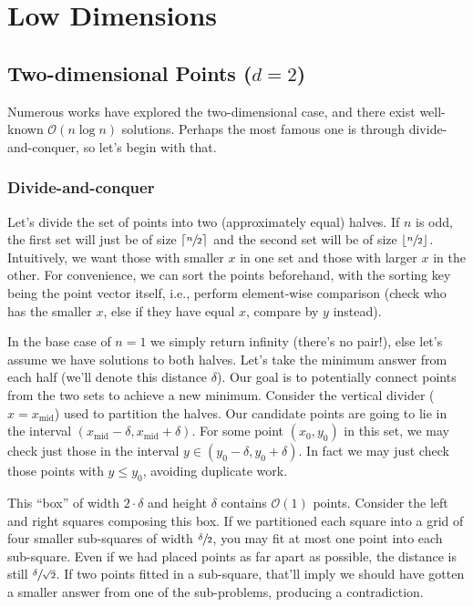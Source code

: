 
\chapter{Low Dimensions}

\section{Two-dimensional Points (\texorpdfstring{$d=2$}{d = 2})}

Numerous works have explored the two-dimensional case, and there exist well-known
$\mathcal{O}(n \log n)$ solutions. Perhaps the most famous one is through divide-and-conquer,
so let's begin with that.

\subsection{Divide-and-conquer}

Let's divide the set of points into two (approximately equal) halves. If $n$ is odd, the
first set will just be of size $\lceil \sfrac{n}{2} \rceil$ and the second set will
be of size $\lfloor \sfrac{n}{2} \rfloor$. Intuitively, we want those with smaller $x$
in one set and those with larger $x$ in the other. For convenience, we can sort the
points beforehand, with the sorting key being the point vector itself, i.e., perform element-wise
comparison (check who has the smaller $x$, else if they have equal $x$, compare by $y$ instead).

In the base case of $n = 1$ we simply return infinity (there's no pair!), else let's assume we have solutions to
both halves. Let's take the minimum answer from each half (we'll denote this distance $\delta$).
Our goal is to potentially connect points from the two sets to achieve a new minimum. Consider the
vertical divider ($x = x_{\text{mid}}$) used to partition the halves. Our candidate points are going to lie in the interval
$(x_{\text{mid}} - \delta, x_{\text{mid}} + \delta)$. For some point $(x_{0}, y_{0})$ in this set, we may check just those in the
interval $y \in (y_{0}-\delta, y_{0} + \delta)$. In fact we may just check those points with $y \leq y_{0}$,
avoiding duplicate work.

This ``box'' of width $2 \cdot \delta$ and height $\delta$ contains $\mathcal{O}(1)$ points. Consider
the left and right squares composing this box. If we partitioned each square into a grid of four smaller
sub-squares of width $\sfrac{\delta}{2}$, you may fit at most one point into each sub-square. Even
if we had placed points as far apart as possible, the distance is still $\sfrac{\delta}{\sqrt{2}}$.
If two points fitted in a sub-square, that'll imply we should have gotten a smaller answer
from one of the sub-problems, producing a contradiction.

